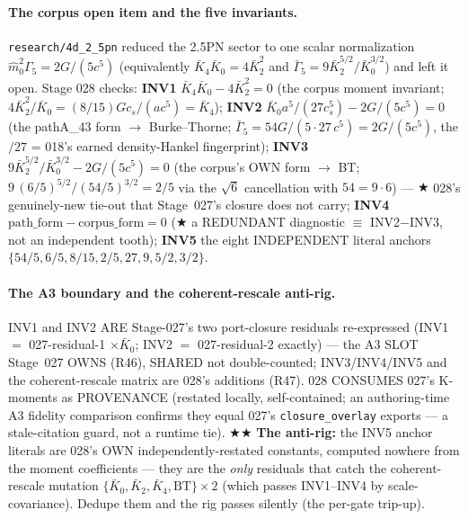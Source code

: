 \paragraph{The corpus open item and the five invariants.}
\texttt{research/4d\_2\_5pn} reduced the 2.5PN sector to one scalar normalization \(\hat m_0^2\Gamma_5=2G/(5c^5)\) (equivalently
\(\bar K_4\bar K_0=4\bar K_2^2\) and \(\bar\Gamma_5=9\bar K_2^{5/2}/\bar K_0^{3/2}\)) and left it open. Stage 028 checks:
\textbf{INV1} \(\bar K_4\bar K_0-4\bar K_2^2=0\) (the corpus moment invariant; \(4\bar K_2^2/\bar K_0=(8/15)Gc_s/(ac^5)=\bar
K_4\)); \textbf{INV2} \(\bar K_0 a^5/(27c_s^5)-2G/(5c^5)=0\) (the pathA\_43 form \(\to\) Burke--Thorne; \(\bar\Gamma_5=54G/
(5\cdot27\,c^5)=2G/(5c^5)\), the \(/27\) = 018's earned density-Hankel fingerprint); \textbf{INV3}
\(9\bar K_2^{5/2}/\bar K_0^{3/2}-2G/(5c^5)=0\) (the corpus's OWN form \(\to\) BT; \(9\,(6/5)^{5/2}/(54/5)^{3/2}=2/5\) via the
\(\sqrt6\) cancellation with \(54=9\cdot6\)) --- \(\bigstar\) 028's genuinely-new tie-out that Stage~027's closure does not
carry; \textbf{INV4} \(\text{path\_form}-\text{corpus\_form}=0\) (\(\bigstar\) a REDUNDANT diagnostic \(\equiv\) INV2\(-\)INV3,
not an independent tooth); \textbf{INV5} the eight INDEPENDENT literal anchors \(\{54/5,6/5,8/15,2/5,27,9,5/2,3/2\}\).

\paragraph{The A3 boundary and the coherent-rescale anti-rig.}
INV1 and INV2 ARE Stage-027's two port-closure residuals re-expressed (INV1 \(=\) 027-residual-1 \(\times\bar K_0\); INV2
\(=\) 027-residual-2 exactly) --- the A3 SLOT Stage~027 OWNS (R46), SHARED not double-counted; INV3/INV4/INV5 and the
coherent-rescale matrix are 028's additions (R47). 028 CONSUMES 027's K\(\)-moments as PROVENANCE (restated locally,
self-contained; an authoring-time A3 fidelity comparison confirms they equal 027's \texttt{closure\_overlay} exports --- a
stale-citation guard, not a runtime tie). \(\bigstar\bigstar\) \textbf{The anti-rig:} the INV5 anchor literals are 028's OWN
independently-restated constants, computed nowhere from the moment coefficients --- they are the \emph{only} residuals that
catch the coherent-rescale mutation \(\{\bar K_0,\bar K_2,\bar K_4,\text{BT}\}\times2\) (which passes INV1--INV4 by
scale-covariance). Dedupe them and the rig passes silently (the per-gate trip-up).

